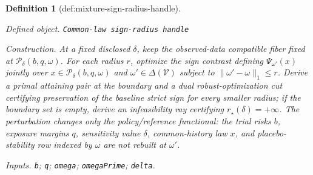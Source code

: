 \documentclass{article}
\newtheorem{definition}{Definition}
\begin{document}
\begin{definition}[def:mixture-sign-radius-handle]\label{def:mixture-sign-radius-handle}
\par\smallskip\noindent\emph{Defined object.} \texttt{Common-\allowbreak{}law sign-\allowbreak{}radius handle}
\par\smallskip\noindent\emph{Construction.} At a fixed disclosed \(\delta\), keep the observed-data compatible fiber fixed at \(\mathcal P_\delta(b,q,\omega)\). For each radius \(r\), optimize the sign contrast defining \(\Psi_{\omega'}(x)\) jointly over \(x\in\mathcal P_\delta(b,q,\omega)\) and \(\omega'\in\Delta(\mathcal V)\) subject to \(\lVert\omega'-\omega\rVert_1\leq r\). Derive a primal attaining pair at the boundary and a dual robust-optimization cut certifying preservation of the baseline strict sign for every smaller radius; if the boundary set is empty, derive an infeasibility ray certifying \(r_\star(\delta)=+\infty\). The perturbation changes only the policy/reference functional: the trial risks \(b\), exposure margins \(q\), sensitivity value \(\delta\), common-history law \(x\), and placebo-stability row indexed by \(\omega\) are not rebuilt at \(\omega'\).
\par\smallskip\noindent\emph{Inputs.} \texttt{b}; \texttt{q}; \texttt{omega}; \texttt{omegaPrime}; \texttt{delta}.
\end{definition}
\end{document}
